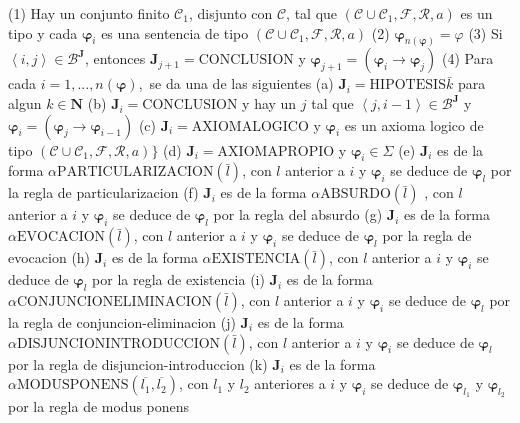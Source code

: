 (1) Hay un conjunto finito \(\mathcal{C}_{1}\), disjunto con \(\mathcal{C }\), tal que \((\mathcal{C}\cup \mathcal{C}_{1},\mathcal{F},\mathcal{R},a)\) es un tipo y cada \(\mathbf{\varphi }_{i}\) es una sentencia de tipo \((\mathcal{C} \cup \mathcal{C}_{1},\mathcal{F},\mathcal{R},a)\)
(2) \(\mathbf{\varphi }_{n(\mathbf{\varphi })}=\varphi \)
(3) Si \(\left\langle i,j\right\rangle \in \mathcal{B}^{\mathbf{J}}\), entonces \(\mathbf{J}_{j+1}=\mathrm{CONCLUSION}\) y \(\mathbf{\varphi }_{j+1}=( \mathbf{\varphi }_{i}\rightarrow \mathbf{\varphi }_{j})\)
(4) Para cada \(i=1,...,n(\mathbf{\varphi }),\) se da una de las siguientes
(a) \(\mathbf{J}_{i}=\mathrm{HIPOTESIS}\bar{k}\) para algun \(k\in \mathbf{N}\)
(b) \(\mathbf{J}_{i}=\mathrm{CONCLUSION}\) y hay un \(j\) tal que \( \left\langle j,i-1\right\rangle \in \mathcal{B}^{\mathbf{J}}\) y \(\mathbf{ \varphi }_{i}=(\mathbf{\varphi }_{j}\rightarrow \mathbf{\varphi }_{i-1})\)
(c) \(\mathbf{J}_{i}=\mathrm{AXIOMALOGICO}\) y \(\mathbf{\varphi }_{i}\) es un axioma logico de tipo \((\mathcal{C}\cup \mathcal{C}_{1},\mathcal{F}, \mathcal{R},a)\}\)
(d) \(\mathbf{J}_{i}=\mathrm{AXIOMAPROPIO}\) y \(\mathbf{\varphi } _{i}\in \Sigma \)
(e) \(\mathbf{J}_{i}\) es de la forma \(\alpha \mathrm{PARTICULARIZACION} (\bar{l})\), con \(l\) anterior a \(i\) y \(\mathbf{\varphi }_{i}\) se deduce de \( \mathbf{\varphi }_{l}\) por la regla de particularizacion
(f) \(\mathbf{J}_{i}\) es de la forma \(\alpha \mathrm{ABSURDO}(\bar{l})\) , con \(l\) anterior a \(i\) y \(\mathbf{\varphi }_{i}\) se deduce de \(\mathbf{ \varphi }_{l}\) por la regla del absurdo
(g) \(\mathbf{J}_{i}\) es de la forma \(\alpha \mathrm{EVOCACION}(\bar{l} )\), con \(l\) anterior a \(i\) y \(\mathbf{\varphi }_{i}\) se deduce de \(\mathbf{ \varphi }_{l}\) por la regla de evocacion
(h) \(\mathbf{J}_{i}\) es de la forma \(\alpha \mathrm{EXISTENCIA}(\bar{l })\), con \(l\) anterior a \(i\) y \(\mathbf{\varphi }_{i}\) se deduce de \(\mathbf{ \varphi }_{l}\) por la regla de existencia
(i) \(\mathbf{J}_{i}\) es de la forma \(\alpha \mathrm{ CONJUNCIONELIMINACION}(\bar{l})\), con \(l\) anterior a \(i\) y \(\mathbf{\varphi } _{i}\) se deduce de \(\mathbf{\varphi }_{l}\) por la regla de conjuncion-eliminacion
(j) \(\mathbf{J}_{i}\) es de la forma \(\alpha \mathrm{ DISJUNCIONINTRODUCCION}(\bar{l})\), con \(l\) anterior a \(i\) y \(\mathbf{\varphi }_{i}\) se deduce de \(\mathbf{\varphi }_{l}\) por la regla de disjuncion-introduccion
(k) \(\mathbf{J}_{i}\) es de la forma \(\alpha \mathrm{MODUSPONENS}( \overline{l_{1}},\overline{l_{2}})\), con \(l_{1}\) y \(l_{2}\) anteriores a \(i\) y \(\mathbf{\varphi }_{i}\) se deduce de \(\mathbf{\varphi }_{l_{1}}\) y \( \mathbf{\varphi }_{l_{2}}\) por la regla de modus ponens
